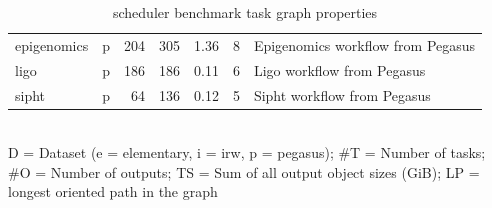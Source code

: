 \begin{table}[h]
\begin{tabular}{l|lrrrr|T}
        epigenomics      & p & 204 & 305   & 1.36   & 8   & Epigenomics
        workflow from Pegasus                                                            \\
        ligo             & p & 186 & 186   & 0.11   & 6   & Ligo workflow from
        Pegasus                                                                          \\
        sipht            & p & 64  & 136   & 0.12   & 5   & Sipht workflow from
        Pegasus                                                                          \\
        \bottomrule
    \end{tabular}\\
    \vspace{2mm}
    D = Dataset (e = elementary, i = irw, p = pegasus); \#T = Number of tasks; \#O = Number of outputs;
    TS = Sum of all output object sizes (GiB); LP = longest oriented path in the graph

    \caption{\estee{} scheduler benchmark task graph properties}
    \label{tab:estee-graph-properties}
\end{table}
